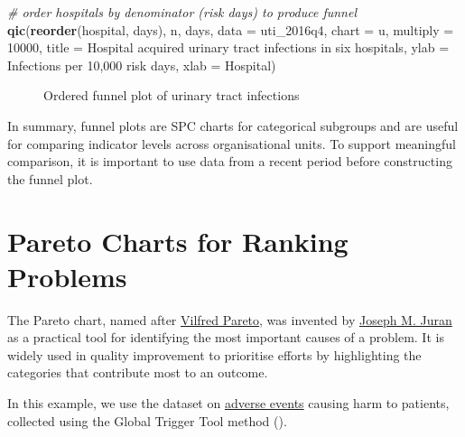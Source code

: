 \documentclass[
]{book}
\makeatletter
\newenvironment{Shaded}{\begin{snugshade}}{\end{snugshade}}
\newcommand{\AttributeTok}[1]{\textcolor[rgb]{0.13,0.29,0.53}{#1}}
\newcommand{\CommentTok}[1]{\textcolor[rgb]{0.56,0.35,0.01}{\textit{#1}}}
\newcommand{\DecValTok}[1]{\textcolor[rgb]{0.00,0.00,0.81}{#1}}
\newcommand{\FunctionTok}[1]{\textcolor[rgb]{0.13,0.29,0.53}{\textbf{#1}}}
\newcommand{\NormalTok}[1]{#1}
\newcommand{\StringTok}[1]{\textcolor[rgb]{0.31,0.60,0.02}{#1}}
\newcommand*\pandocbounded[1]{%
  \sbox\pandoc@box{#1}%
  \Gscale@div\@tempa{\textheight}{\dimexpr\ht\pandoc@box+\dp\pandoc@box\relax}%
  \Gscale@div\@tempb{\linewidth}{\wd\pandoc@box}%
  \ifdim\@tempb\p@<\@tempa\p@\let\@tempa\@tempb\fi%
  \ifdim\@tempa\p@<\p@\scalebox{\@tempa}{\usebox\pandoc@box}%
  \else\usebox{\pandoc@box}%
  \fi%
}
\makeatother
\begin{document}
\begin{Shaded}
\begin{Highlighting}[]
\CommentTok{\# order hospitals by denominator (risk days) to produce funnel}
\FunctionTok{qic}\NormalTok{(}\FunctionTok{reorder}\NormalTok{(hospital, days), n, days,}
    \AttributeTok{data     =}\NormalTok{ uti\_2016q4,}
    \AttributeTok{chart    =} \StringTok{\textquotesingle{}u\textquotesingle{}}\NormalTok{,}
    \AttributeTok{multiply =} \DecValTok{10000}\NormalTok{,}
    \AttributeTok{title    =} \StringTok{\textquotesingle{}Hospital acquired urinary tract infections in six hospitals\textquotesingle{}}\NormalTok{,}
    \AttributeTok{ylab     =} \StringTok{\textquotesingle{}Infections per 10,000 risk days\textquotesingle{}}\NormalTok{,}
    \AttributeTok{xlab     =} \StringTok{\textquotesingle{}Hospital\textquotesingle{}}\NormalTok{)}
\end{Highlighting}
\end{Shaded}

\begin{figure}
\centering
\pandocbounded{}
\caption{Ordered funnel plot of urinary tract infections}
\end{figure}

In summary, funnel plots are SPC charts for categorical subgroups and
are useful for comparing indicator levels across organisational units.
To support meaningful comparison, it is important to use data from a
recent period before constructing the funnel plot.

\chapter{Pareto Charts for Ranking
Problems}\label{pareto-charts-for-ranking-problems}

The Pareto chart, named after
\href{https://en.wikipedia.org/wiki/Vilfredo_Pareto}{Vilfred Pareto},
was invented by
\href{https://en.wikipedia.org/wiki/Joseph_M._Juran}{Joseph M. Juran} as
a practical tool for identifying the most important causes of a problem.
It is widely used in quality improvement to prioritise efforts by
highlighting the categories that contribute most to an outcome.

In this example, we use the dataset on \hyperref[adverse-events]{adverse
events} causing harm to patients, collected using the Global Trigger
Tool method ().
\end{document}
